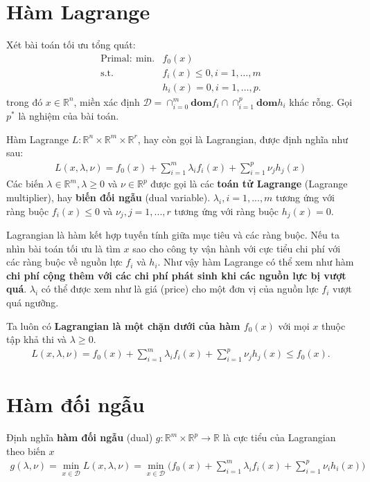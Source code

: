 \documentclass{book}
\begin{document}
\section{Hàm Lagrange}
Xét bài toán tối ưu tổng quát:
\begin{align}
\mathrm{Primal: ~min.} & f_0(x)\\
\mathrm{s.t.} & f_i(x) \leq 0, i = 1, \ldots, m \\
			& h_i(x) = 0, i = 1, \ldots, p.
			\label{optProb}
\end{align}
trong đó $x \in \mathbb{R}^n$, miền xác định $\mathcal{D} = \cap_{i=0}^m \mathbf{dom} f_i \cap \cap_{i=1}^p \mathbf{dom} h_i$ khác rỗng.
Gọi $p^*$ là nghiệm của bài toán.

Hàm Lagrange $L: \mathbb{R}^n \times \mathbb{R}^m \times \mathbb{R}^r$, hay còn gọi là Lagrangian, được định nghĩa như sau: 
\begin{align*}
L(x, \lambda, \nu) = f_0(x) + \sum_{i = 1}^m \lambda_i f_i(x) + \sum_{i = 1}^p \nu_j h_j(x)
\end{align*}
Các biến $\lambda \in \mathbb{R}^m, \lambda \geq 0$ và $\nu \in \mathbb{R}^p$ được gọi là các \textbf{toán tử Lagrange} (Lagrange multiplier), hay \textbf{biến đối ngẫu} (dual variable). $\lambda_i, i=1,...,m$ tương ứng với ràng buộc $f_i (x) \leq 0$ và $\nu_j, j=1,...,r$ tương ứng với ràng buộc $h_j(x) = 0$.

Lagrangian là hàm kết hợp tuyến tính giữa mục tiêu và các ràng buộc.
Nếu ta nhìn bài toán tối ưu là tìm $x$ sao cho công ty vận hành với cực tiểu chi phí với các ràng buộc về nguồn lực $f_i$ và $h_i$. Như vậy hàm Lagrange có thể xem như hàm \textbf{chi phí cộng thêm với các chi phí phát sinh khi các nguồn lực bị vượt quá}. 
$\lambda_i$ có thể được xem như là giá (price) cho một đơn vị của nguồn lực $f_i$ vượt quá ngưỡng.

Ta luôn có \textbf{Lagrangian là một chặn dưới của hàm $f_0(x)$} với mọi $x$ thuộc tập khả thi và $\lambda \geq 0$.
\begin{align}
L(x, \lambda, \nu) = f_0(x) + \sum_{i = 1}^m \lambda_i f_i(x) + \sum_{i = 1}^p \nu_j h_j(x) \leq f_0(x).
\label{eq:lagrangian_lowerbound}
\end{align}

\section{Hàm đối ngẫu}
Định nghĩa \textbf{hàm đối ngẫu} (dual) $g: \mathbb{R}^m \times \mathbb{R}^p \rightarrow \mathbb{R}$ là cực tiểu của Lagrangian theo biến $x$
\begin{align*}
g(\lambda, \nu) = \min_{x \in \mathcal{D}} L(x, \lambda, \nu) = \min_{x \in \mathcal{D}} \Big( f_0(x) + \sum_{i = 1}^m \lambda_i f_i(x) + \sum_{i = 1}^p \nu_i h_i(x) \Big)
\end{align*}
\end{document}
